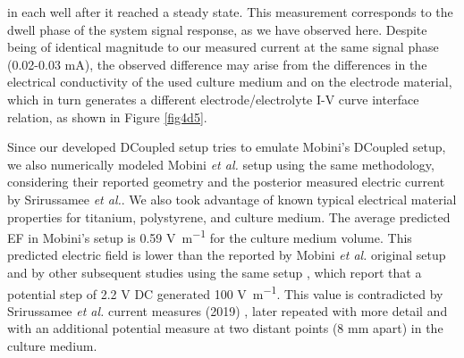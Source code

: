 in each well after it reached a steady state. This measurement corresponds to the dwell phase of the system signal response, as we have observed here. Despite being of identical magnitude to our measured current at the same signal phase (0.02-0.03 \si{\milli\ampere}), the observed difference may arise from the differences in the electrical conductivity of the used culture medium and on the electrode material, which in turn generates a different electrode/electrolyte I-V curve interface relation, as shown in Figure \ref{fig4d5}.   

Since our developed DCoupled setup tries to emulate Mobini's \ac{DCoupled} setup, we also numerically modeled Mobini \textit{et al.} setup \cite{Mobini2016-jh} using the same methodology, considering their reported geometry and the posterior measured electric current by Srirussamee \textit{et al.}. We also took advantage of known typical electrical material properties for titanium, polystyrene, and culture medium. The average predicted \acs{EF} in Mobini's setup is 0.59 \si{\volt\per\meter} for the culture medium volume. This predicted electric field is lower than the reported by Mobini \textit{et al.} \cite{Mobini2016-jh} original setup and by other subsequent studies using the same setup \cite{Mobini2017-wp, Mobini2017-zr, Leppik2018-bw}, which report that a potential step of 2.2 \si{\volt} DC generated 100 \si{\volt\per\meter}. This value is contradicted by Srirussamee \textit{et al.} current measures (2019) \cite{Srirussamee2019-ai}, later repeated with more detail \cite{Srirussamee2021-cj} and with an additional potential measure at two distant points (8 \si{\milli\meter} apart) in the culture medium.

